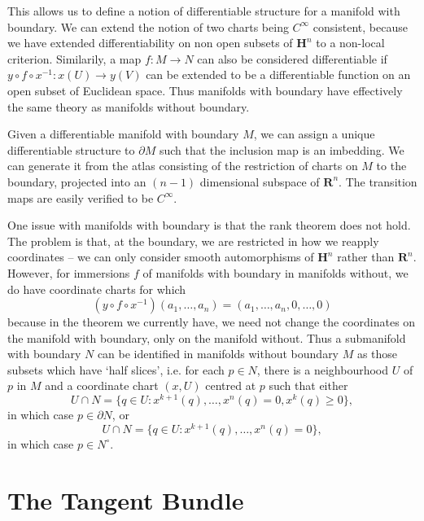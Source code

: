 This allows us to define a notion of differentiable structure for a manifold with boundary. We can extend the notion of two charts being $C^\infty$ consistent, because we have extended differentiability on non open subsets of $\mathbf{H}^n$ to a non-local criterion. Similarily, a map $f: M \to N$ can also be considered differentiable if $y \circ f \circ x^{-1}:x(U) \to y(V)$ can be extended to be a differentiable function on an open subset of Euclidean space. Thus manifolds with boundary have effectively the same theory as manifolds without boundary.

\begin{example}
    Given a differentiable manifold with boundary $M$, we can assign a unique differentiable structure to $\partial M$ such that the inclusion map is an imbedding. We can generate it from the atlas consisting of the restriction of charts on $M$ to the boundary, projected into an $(n-1)$ dimensional subspace of $\mathbf{R}^n$. The transition maps are easily verified to be $C^\infty$.
\end{example}

One issue with manifolds with boundary is that the rank theorem does not hold. The problem is that, at the boundary, we are restricted in how we reapply coordinates -- we can only consider smooth automorphisms of $\mathbf{H}^n$ rather than $\mathbf{R}^n$. However, for immersions $f$ of manifolds with boundary in manifolds without, we do have coordinate charts for which
%
\[ (y \circ f \circ x^{-1})(a_1, \dots, a_n) = (a_1, \dots, a_n, 0, \dots, 0) \]
%
because in the theorem we currently have, we need not change the coordinates on the manifold with boundary, only on the manifold without. Thus a submanifold with boundary $N$ can be identified in manifolds without boundary $M$ as those subsets which have `half slices', i.e. for each $p \in N$, there is a neighbourhood $U$ of $p$ in $M$ and a coordinate chart $(x,U)$ centred at $p$ such that either
%
\[ U \cap N = \{ q \in U : x^{k+1}(q), \dots, x^n(q) = 0, x^k(q) \geq 0 \}, \]
%
in which case $p \in \partial N$, or
%
\[ U \cap N = \{ q \in U : x^{k+1}(q), \dots, x^n(q) = 0 \}, \]
%
in which case $p \in N^\circ$.




\chapter{The Tangent Bundle}

